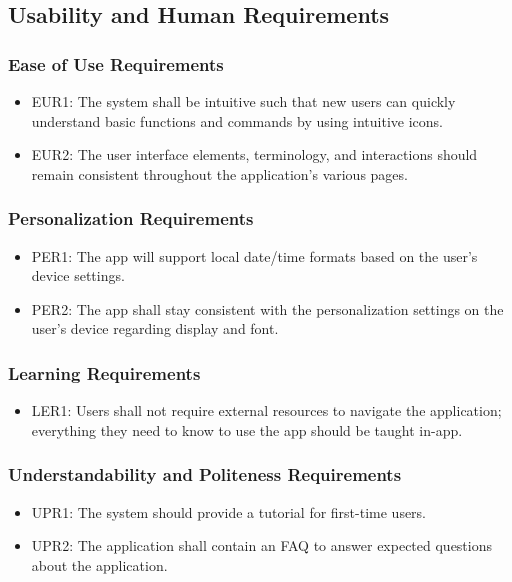 \documentclass[12pt]{article}
\begin{document}
\subsection{Usability and Human Requirements}

\subsubsection{Ease of Use Requirements}
\begin{itemize}
\item EUR1: The system shall be intuitive such that new users can quickly understand basic functions and commands by using intuitive icons.
\item EUR2: The user interface elements, terminology, and interactions should remain consistent throughout the application’s various pages.
\end{itemize}

\subsubsection{Personalization Requirements}
\begin{itemize}
\item PER1: The app will support local date/time formats based on the user’s device settings.
\item PER2: The app shall stay consistent with the personalization settings on the user’s device regarding display and font.
\end{itemize}

\subsubsection{Learning Requirements}
\begin{itemize}
\item LER1: Users shall not require external resources to navigate the application; everything they need to know to use the app should be taught in-app.
\end{itemize}

\subsubsection{Understandability and Politeness Requirements}
\begin{itemize}
\item UPR1: The system should provide a tutorial for first-time users.
\item UPR2: The application shall contain an FAQ to answer expected questions about the application.
\end{itemize}
\end{document}
